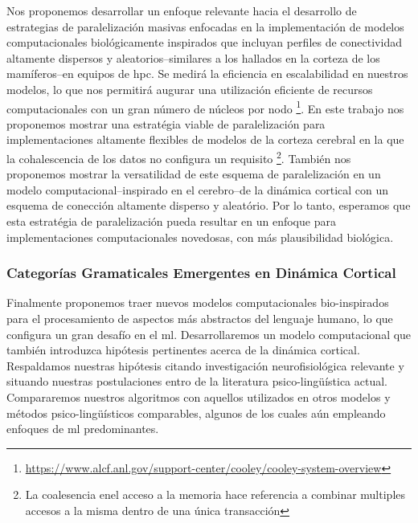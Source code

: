 Nos proponemos desarrollar un enfoque relevante hacia el desarrollo de estrategias de paralelización masivas enfocadas en la implementación de modelos computacionales biológicamente inspirados que incluyan perfiles de conectividad altamente dispersos y aleatorios--similares a los hallados en la corteza de los mamíferos--en equipos de \gls{hpc}.
Se medirá la eficiencia en escalabilidad en nuestros modelos, lo que nos permitirá augurar una utilización eficiente de recursos computacionales con un gran número de núcleos por nodo \footnote{\url{https://www.alcf.anl.gov/support-center/cooley/cooley-system-overview}}.
En este trabajo nos proponemos mostrar una estratégia viable de paralelización para implementaciones altamente flexibles de modelos de la corteza cerebral en la que la cohalescencia de los datos no configura un requisito \footnote{La coalesencia enel acceso a la memoria hace referencia a combinar multiples accesos a la misma dentro de una única transacción}.
También nos proponemos mostrar la versatilidad de este esquema de paralelización en un modelo computacional--inspirado en el cerebro--de la dinámica cortical con un esquema de conección altamente disperso y aleatório.
Por lo tanto, esperamos que esta estratégia de paralelización pueda resultar en un enfoque para implementaciones computacionales novedosas, con más plausibilidad biológica.




\subsubsection{Categorías Gramaticales Emergentes en Dinámica Cortical}

Finalmente proponemos traer nuevos modelos computacionales bio-inspirados para el procesamiento de aspectos más abstractos del lenguaje humano,
lo que configura un gran desafío en el \gls{ml}.
Desarrollaremos un modelo computacional que también introduzca hipótesis pertinentes acerca de la dinámica cortical.
Respaldamos nuestras hipótesis citando investigación neurofisiológica relevante y situando nuestras postulaciones entro de la literatura psico-lingüística actual.
Compararemos nuestros algoritmos con aquellos utilizados en otros modelos y métodos psico-lingüísticos comparables, algunos de los cuales aún empleando enfoques de \gls{ml} predominantes. 

